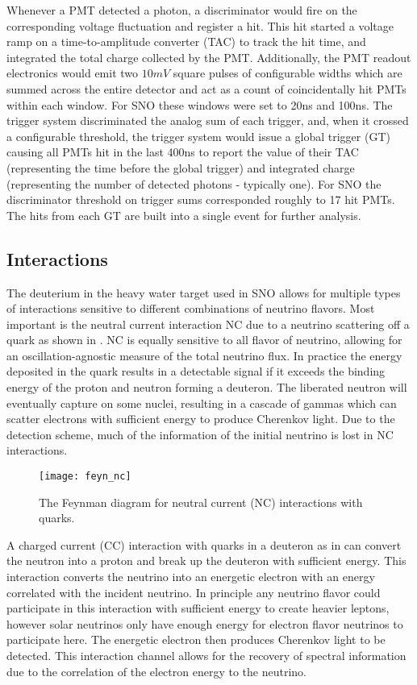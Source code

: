 Whenever a PMT detected a photon, a discriminator would fire on the corresponding voltage fluctuation and register a hit.
This hit started a voltage ramp on a time-to-amplitude converter (TAC) to track the hit time, and integrated the total charge collected by the PMT.
Additionally, the PMT readout electronics would emit two $10mV$ square pulses of configurable widths which are summed across the entire detector and act as a count of coincidentally hit PMTs within each window.
For SNO these windows were set to 20ns and 100ns.
The trigger system discriminated the analog sum of each trigger, and, when it crossed a configurable threshold, the trigger system would issue a global trigger (GT) causing all PMTs hit in the last 400ns to report the value of their TAC (representing the time before the global trigger) and integrated charge (representing the number of detected photons - typically one).
For SNO the discriminator threshold on trigger sums corresponded roughly to 17 hit PMTs.
The hits from each GT are built into a single event for further analysis.

\subsection{Interactions}

The deuterium in the heavy water target used in SNO allows for multiple types of interactions sensitive to different combinations of neutrino flavors.
Most important is the neutral current interaction NC due to a neutrino scattering off a quark as shown in .
NC is equally sensitive to all flavor of neutrino, allowing for an oscillation-agnostic measure of the total neutrino flux.
In practice the energy deposited in the quark results in a detectable signal if it exceeds the binding energy of the proton and neutron forming a deuteron.
The liberated neutron will eventually capture on some nuclei, resulting in a cascade of gammas which can scatter electrons with sufficient energy to produce Cherenkov light.
Due to the detection scheme, much of the information of the initial neutrino is lost in NC interactions.

\begin{figure}
\centering
    \texttt{[image: feyn\_nc]}
    \caption{\label{fig:NC}The Feynman diagram for neutral current (NC) interactions with quarks.}
\end{figure}

A charged current (CC) interaction with quarks in a deuteron as in  can convert the neutron into a proton and break up the deuteron with sufficient energy.
This interaction converts the neutrino into an energetic electron with an energy correlated with the incident neutrino.
In principle any neutrino flavor could participate in this interaction with sufficient energy to create heavier leptons, however solar neutrinos only have enough energy for electron flavor neutrinos to participate here.
The energetic electron then produces Cherenkov light to be detected.
This interaction channel allows for the recovery of spectral information due to the correlation of the electron energy to the neutrino.

